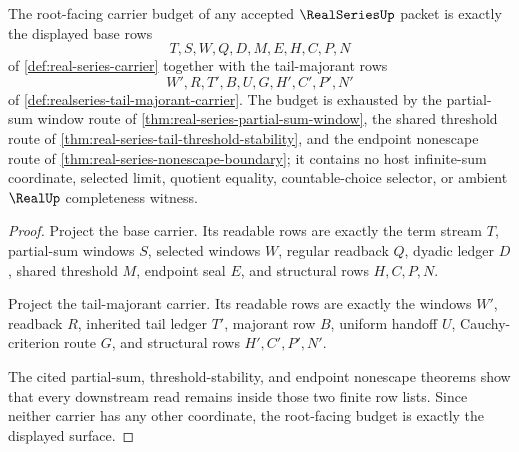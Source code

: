 \begin{theorem}
\label{thm:realseries-root-carrier-budget}
The root-facing carrier budget of any accepted $\RealSeriesUp$ packet is exactly the displayed base rows
$$
T,S,W,Q,D,M,E,H,C,P,N
$$
of \autoref{def:real-series-carrier} together with the tail-majorant rows
$$
W',R,T',B,U,G,H',C',P',N'
$$
of \autoref{def:realseries-tail-majorant-carrier}. The budget is exhausted by the partial-sum window route of \autoref{thm:real-series-partial-sum-window}, the shared threshold route of \autoref{thm:real-series-tail-threshold-stability}, and the endpoint nonescape route of \autoref{thm:real-series-nonescape-boundary}; it contains no host infinite-sum coordinate, selected limit, quotient equality, countable-choice selector, or ambient $\RealUp$ completeness witness.
\end{theorem}
\begin{proof}
Project the base carrier. Its readable rows are exactly the term stream $T$, partial-sum windows $S$, selected windows $W$, regular readback $Q$, dyadic ledger $D$, shared threshold $M$, endpoint seal $E$, and structural rows $H,C,P,N$.

Project the tail-majorant carrier. Its readable rows are exactly the windows $W'$, readback $R$, inherited tail ledger $T'$, majorant row $B$, uniform handoff $U$, Cauchy-criterion route $G$, and structural rows $H',C',P',N'$.

The cited partial-sum, threshold-stability, and endpoint nonescape theorems show that every downstream read remains inside those two finite row lists. Since neither carrier has any other coordinate, the root-facing budget is exactly the displayed surface.
\end{proof}

